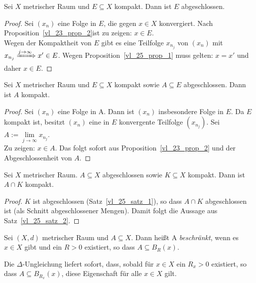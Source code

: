 \begin{Satz}\label{vl_25_satz_1} %
	Sei $X$ metrischer Raum und $E \subseteq X$ kompakt. Dann ist $E$ abgeschlossen. 
\end{Satz}

\begin{proof}
	Sei $(x_n)$ eine Folge in $E$, die gegen $x \in X$ konvergiert. Nach 
	Proposition~\ref{vl_23_prop_2}ist zu zeigen: $x \in E$. \\
	Wegen der Kompaktheit von $E$ gibt es eine Teilfolge $x_{n_j}$ von $(x_n)$ 
	mit \\
	\mbox{$x_{n_j} \xRightarrow{j \rightarrow \infty} x' \in E$}. Wegen 
	Proposition~\ref{vl_25_prop_1} muss gelten: $x = x'$ und daher $x \in E$. 
\end{proof}

\begin{Satz}\label{vl_25_satz_2}%
	Sei $X$ metrischer Raum und $E \subseteq X$ kompakt sowie $A \subseteq E$ 
	abgeschlossen. Dann ist $A$ kompakt.
\end{Satz}

\begin{proof}
	Sei $(x_n)$ eine Folge in A. Dann ist $(x_n)$ insbesondere Folge in $E$. 
	Da $E$ kompakt ist, besitzt $(x_n)$ eine in $E$ konvergente 
	Teilfolge $(x_{n_j})$. Sei $A := \lim\limits_{j \rightarrow \infty}{x_{n_j}}$.\\
	Zu zeigen: $x \in A$. Das folgt sofort aus Proposition~\ref{vl_23_prop_2} 
	und der Abgeschlossenheit 
	von $A$.
\end{proof}

\begin{Korollar}%
	Sei $X$ metrischer Raum. $A \subseteq X$ abgeschlossen sowie $K \subseteq X$ 
	kompakt. Dann ist $A \cap K$ kompakt.
\end{Korollar}

\begin{proof}
	$K$ ist abgeschlossen (Satz~\ref{vl_25_satz_1}), so dass $A \cap K$ 
	abgeschlossen ist (als Schnitt abgeschlossener Mengen). Damit folgt die 
	Aussage aus Satz~\ref{vl_25_satz_2}.
\end{proof}

\begin{Definition}%
	Sei $(X,d)$ metrischer Raum und $A \subseteq X$. Dann heißt A \emph{beschränkt}, 
	wenn es $x \in X$ gibt und ein $R> 0$ existiert, so dass $A \subseteq B_R(x)$.
\end{Definition}

\begin{Bemerkung}
	Die $\Delta$-Ungleichung liefert sofort, dass, sobald für $x \in X$ ein $R_x >0$ 
	existiert, so dass $A\subseteq B_{R_x}(x)$, diese Eigenschaft für alle 
	$x\in X$ gilt.
\end{Bemerkung}

